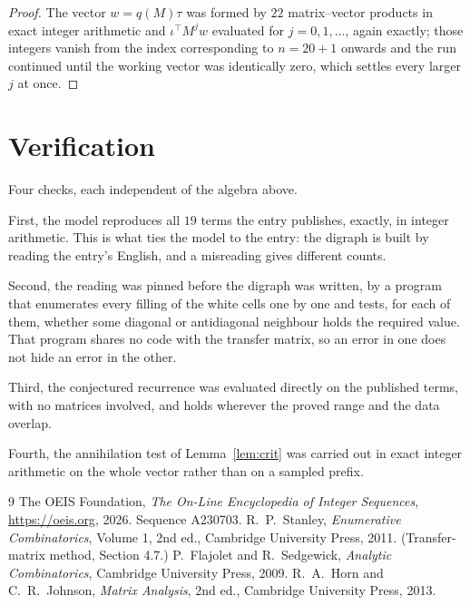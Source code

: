 \documentclass[11pt,a4paper]{article}
\theoremstyle{plain}
\theoremstyle{definition}
\begin{document}
\begin{proof}
The vector $w=q(M)\tau$ was formed by $22$ matrix--vector products in exact integer
arithmetic and $\iota^{\!\top}M^{j}w$ evaluated for $j=0,1,\dots$, again exactly; those
integers vanish from the index corresponding to $n=20+1$ onwards and the run continued
until the working vector was identically zero, which settles every larger $j$ at once.
\end{proof}

\section{Verification}

Four checks, each independent of the algebra above.

First, the model reproduces all $19$ terms the entry publishes, exactly, in integer
arithmetic. This is what ties the model to the entry: the digraph is built by reading the
entry's English, and a misreading gives different counts.

Second, the reading was pinned before the digraph was written, by a program that enumerates
every filling of the white cells one by one and tests, for each of them, whether some
diagonal or antidiagonal neighbour holds the required value. That program shares no code with the transfer matrix, so an error in one does not
hide an error in the other.

Third, the conjectured recurrence was evaluated directly on the published terms, with no
matrices involved, and holds wherever the proved range and the data overlap.

Fourth, the annihilation test of Lemma~\ref{lem:crit} was carried out in exact integer
arithmetic on the whole vector rather than on a sampled prefix.

\begin{thebibliography}{9}
 The OEIS Foundation, \emph{The On-Line Encyclopedia of Integer
Sequences}, \url{https://oeis.org}, 2026. Sequence A230703.
 R.~P.~Stanley, \emph{Enumerative Combinatorics}, Volume 1, 2nd ed.,
Cambridge University Press, 2011. (Transfer-matrix method, Section 4.7.)
 P.~Flajolet and R.~Sedgewick, \emph{Analytic Combinatorics}, Cambridge
University Press, 2009.
 R.~A.~Horn and C.~R.~Johnson, \emph{Matrix Analysis}, 2nd ed., Cambridge
University Press, 2013.
\end{thebibliography}
\end{document}
